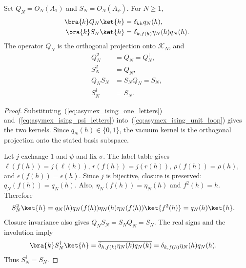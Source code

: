 \begin{lemma}%
    \label{thm:asymex_ising_path_operators}
    \leanok
    Set $Q_N=O_N(A_1)$ and $S_N=O_N(A_\psi)$. For $N\geq1$,
    \begin{align}
        \bra{k}Q_N\ket{h} & =\delta_{kh}q_N(h),
        \label{eq:asymex_ising_vacuum_kernel}                \\
        \bra{k}S_N\ket{h} & =\delta_{k,f(h)}\eta_N(h)q_N(h).
        \label{eq:asymex_ising_fermion_kernel}
    \end{align}
    The operator $Q_N$ is the orthogonal projection onto $\mathcal K_N$,
    and
    \begin{align}
        Q_N^2       & =Q_N=Q_N^\dagger, \\
        S_N^2       & =Q_N,             \\
        Q_NS_N      & =S_NQ_N=S_N,      \\
        S_N^\dagger & =S_N.
    \end{align}
\end{lemma}

\begin{proof}
    \leanok
    Substituting~(\ref{eq:asymex_ising_one_letters})
    and~(\ref{eq:asymex_ising_psi_letters})
    into~(\ref{eq:asymex_ising_unit_loop}) gives the two kernels.
    Since $q_N(h)\in\{0,1\}$, the vacuum kernel is the orthogonal
    projection onto the stated basis subspace.

    Let $j$ exchange $1$ and $\psi$ and fix $\sigma$. The label table gives
    $\ell(f(h))=j(\ell(h))$, $r(f(h))=j(r(h))$,
    $\rho(f(h))=\rho(h)$, and $\epsilon(f(h))=\epsilon(h)$.
    Since $j$ is bijective, closure is preserved:
    $q_N(f(h))=q_N(h)$. Also,
    $\eta_N(f(h))=\eta_N(h)$ and $f^2(h)=h$. Therefore
    \begin{align}
        S_N^2\ket{h}
         & =q_N(h)q_N(f(h))\eta_N(h)\eta_N(f(h))\ket{f^2(h)}
        =q_N(h)\ket{h}.
    \end{align}
    Closure invariance also gives $Q_NS_N=S_NQ_N=S_N$.
    The real signs and the involution imply
    \begin{align}
        \bra{k}S_N^\dagger\ket{h}
         & =\overline{\delta_{h,f(k)}\eta_N(k)q_N(k)}
        =\delta_{k,f(h)}\eta_N(h)q_N(h).
    \end{align}
    Thus $S_N^\dagger=S_N$.
\end{proof}

